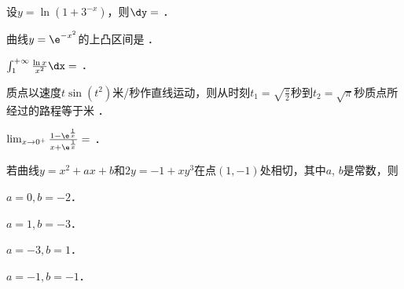 \documentclass[plain,noanswer,medmath]{../../template/jnuexam}
\begin{document}






\begin{problem}
设$y = \ln(1 + 3^{- x})$，则$\dy =$ \fillin{}．
\end{problem}


\begin{problem}
曲线$y = \e^{-x^2}$的上凸区间是 \fillin{}．
\end{problem}


\begin{problem}
$\int_1^{+\infty} \frac{\ln x}{x^2} \dx =$ \fillin{}．
\end{problem}


\begin{problem}
质点以速度$t\sin(t^2)$米/秒作直线运动，则从时刻$t_1 = \sqrt{\frac{\pi}{2}}$秒到$t_2 = \sqrt{\pi}$秒质点所经过的路程等于米 \fillin{}．
\end{problem}


\begin{problem}
$\lim_{x \to 0^+} \frac{1-\e^{\frac{1}{x}}}{x+\e^{\frac{1}{x}}}=$ \fillin{}．
\end{problem}




\begin{problem}
若曲线$y = x^2 + ax + b$和$2y = - 1 + xy^3$在点$(1, -1)$处相切，其中$a$, $b$是常数，则\pickout{}
\begin{abcd}
\item $a = 0,b = - 2$．		
\item $a = 1,b = - 3$．
\item $a = - 3,b = 1$．		
\item $a = - 1,b = - 1$．
\end{abcd}
\end{problem}
\end{document}
